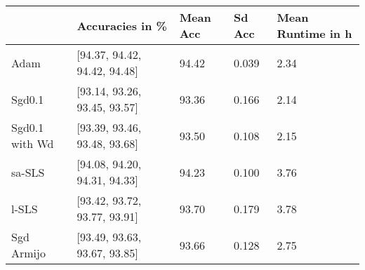 \begin{tabular}{lllll}
\toprule
{} &               Accuracies in \% & Mean Acc & Sd Acc & Mean Runtime in h \\
\midrule
Adam           &  [94.37, 94.42, 94.42, 94.48] &    94.42 &  0.039 &              2.34 \\
Sgd0.1         &  [93.14, 93.26, 93.45, 93.57] &    93.36 &  0.166 &              2.14 \\
Sgd0.1 with Wd &  [93.39, 93.46, 93.48, 93.68] &    93.50 &  0.108 &              2.15 \\
sa-SLS         &  [94.08, 94.20, 94.31, 94.33] &    94.23 &  0.100 &              3.76 \\
l-SLS          &  [93.42, 93.72, 93.77, 93.91] &    93.70 &  0.179 &              3.78 \\
Sgd Armijo     &  [93.49, 93.63, 93.67, 93.85] &    93.66 &  0.128 &              2.75 \\
\bottomrule
\end{tabular}
